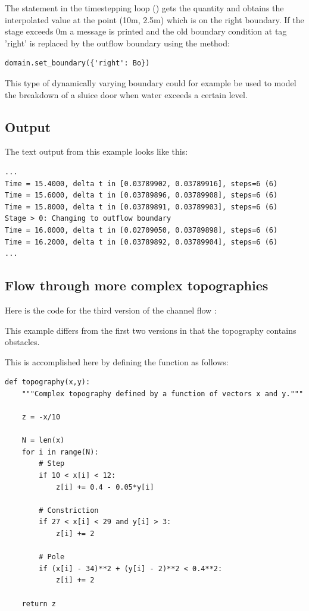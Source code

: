 \documentclass{manual}
\begin{document}
\label{sec:change boundary code}
The  statement in the timestepping loop () gets the quantity
 and obtains the interpolated value at the point (10m,
2.5m) which is on the right boundary. If the stage exceeds 0m a
message is printed and the old boundary condition at tag 'right' is
replaced by the outflow boundary using the method:

\begin{verbatim}
domain.set_boundary({'right': Bo})
\end{verbatim}

This type of dynamically varying boundary could for example be
used to model the breakdown of a sluice door when water exceeds a certain level.

\subsection{Output}

The text output from this example looks like this:

\begin{verbatim}
...
Time = 15.4000, delta t in [0.03789902, 0.03789916], steps=6 (6)
Time = 15.6000, delta t in [0.03789896, 0.03789908], steps=6 (6)
Time = 15.8000, delta t in [0.03789891, 0.03789903], steps=6 (6)
Stage > 0: Changing to outflow boundary
Time = 16.0000, delta t in [0.02709050, 0.03789898], steps=6 (6)
Time = 16.2000, delta t in [0.03789892, 0.03789904], steps=6 (6)
...
\end{verbatim}

\subsection{Flow through more complex topographies}

Here is the code for the third version of the channel flow :



This example differs from the first two versions in that the topography
contains obstacles.

This is accomplished here by defining the function  as follows:

\begin{verbatim}
def topography(x,y):
    """Complex topography defined by a function of vectors x and y."""

    z = -x/10

    N = len(x)
    for i in range(N):
        # Step
        if 10 < x[i] < 12:
            z[i] += 0.4 - 0.05*y[i]

        # Constriction
        if 27 < x[i] < 29 and y[i] > 3:
            z[i] += 2

        # Pole
        if (x[i] - 34)**2 + (y[i] - 2)**2 < 0.4**2:
            z[i] += 2

    return z
\end{verbatim}
\end{document}
